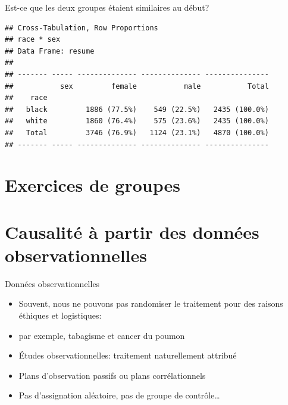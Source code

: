 \documentclass[ignorenonframetext,]{beamer}
\newenvironment{Shaded}{\begin{snugshade}}{\end{snugshade}}
\newcommand{\KeywordTok}[1]{\textcolor[rgb]{0.13,0.29,0.53}{\textbf{#1}}}
\newcommand{\NormalTok}[1]{#1}
\newcommand{\OperatorTok}[1]{\textcolor[rgb]{0.81,0.36,0.00}{\textbf{#1}}}
\begin{document}
\begin{frame}[fragile]{Est-ce que les deux groupes étaient similaires au
début?}
\protect\hypertarget{est-ce-que-les-deux-groupes-etaient-similaires-au-debut}{}

\begin{Shaded}
\end{Shaded}

\begin{verbatim}
## Cross-Tabulation, Row Proportions  
## race * sex  
## Data Frame: resume  
## 
## ------- ----- -------------- -------------- ---------------
##           sex         female           male           Total
##    race                                                    
##   black         1886 (77.5%)    549 (22.5%)   2435 (100.0%)
##   white         1860 (76.4%)    575 (23.6%)   2435 (100.0%)
##   Total         3746 (76.9%)   1124 (23.1%)   4870 (100.0%)
## ------- ----- -------------- -------------- ---------------
\end{verbatim}

\end{frame}

\hypertarget{exercices-de-groupes}{%
\section{Exercices de groupes}\label{exercices-de-groupes}}

\hypertarget{causalite-a-partir-des-donnees-observationnelles}{%
\section{Causalité à partir des données
observationnelles}\label{causalite-a-partir-des-donnees-observationnelles}}

\begin{frame}{Données observationnelles}
\protect\hypertarget{donnees-observationnelles}{}

\begin{itemize}
\item
  Souvent, nous ne pouvons pas randomiser le traitement pour des raisons
  éthiques et logistiques:
\item
  par exemple, tabagisme et cancer du poumon
\item
  Études observationnelles: traitement naturellement attribué
\item
  Plans d'observation passifs ou plans corrélationnels
\item
  Pas d'assignation aléatoire, pas de groupe de contrôle\ldots{}
\end{itemize}

\end{frame}
\end{document}
